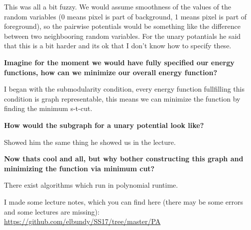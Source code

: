 \documentclass{scrartcl}
\begin{document}
This was all a bit fuzzy. We would assume smoothness of the values of the random variables (0 means pixel is part of background, 1 means pixel is part of foreground), so the pairwise potentials would be something like the difference between two neighbooring random variables. For the unary potantials he said that this is a bit harder and its ok that I don't know how to specify these.

\textbf{Imagine for the moment we would have fully specified our energy functions, how can we minimize our overall energy function?}

I began with the submodularity condition, every energy function fullfilling this condition is graph representable, this means we can minimize the function by finding the minimum s-t-cut.

\textbf{How would the subgraph for a unary potential look like?}

Showed him the same thing he showed us in the lecture.

\textbf{Now thats cool and all, but why bother constructing this graph and minimizing the function via minimum cut?}

There exist algorithms which run in polynomial runtime.

\bigbreak
\bigbreak

I made some lecture notes, which you can find here (there may be some errors and some lectures are missing): 
\center
\url{https://github.com/elbundy/SS17/tree/master/PA}
\end{document}
